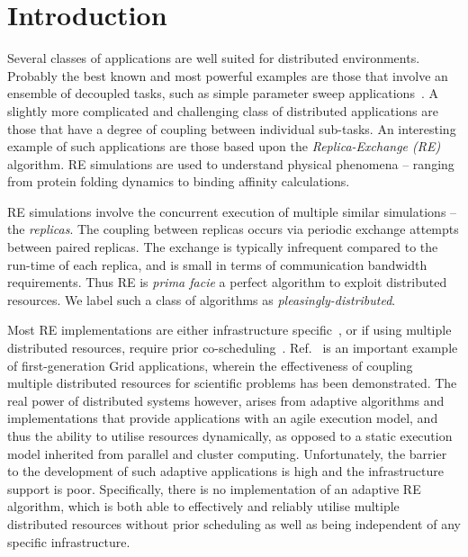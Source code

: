 \documentclass{rspublic}
\begin{document}
\section{Introduction}

Several classes of applications are well suited for distributed
environments. Probably the best known and most powerful examples are
those that involve an ensemble of decoupled tasks, such as simple
parameter sweep applications~\citep{1239909}.  A slightly more
complicated and challenging class of distributed applications are
those that have a degree of coupling between individual sub-tasks.  An
interesting example of such applications are those based upon the
\emph{Replica-Exchange (RE)}~\citep{hansmann,Sugita:1999rm} algorithm.
RE simulations are used to understand physical phenomena -- ranging
from protein folding dynamics to binding affinity calculations.

RE simulations involve the concurrent execution of multiple similar
simulations -- the \emph{replicas}. The coupling between replicas
occurs via periodic exchange attempts between paired replicas. The
exchange is typically infrequent compared to the run-time of each
replica, and is small in terms of communication bandwidth
requirements. Thus RE is {\it prima facie} a perfect algorithm to
exploit distributed resources. We label such a class of algorithms as
{\it pleasingly-distributed}.

Most RE implementations are either infrastructure
specific~\citep{Woods:2005nx}, or if using multiple distributed
resources, require prior co-scheduling~\citep{repex_mpig}.
Ref.~\citep{repex_mpig} is an important example of first-generation
Grid applications, wherein the effectiveness of coupling multiple
distributed resources for scientific problems has been demonstrated.
The real power of distributed systems however, arises from adaptive
algorithms and implementations that provide applications with an agile
execution model, and thus the ability to utilise resources
dynamically, as opposed to a static execution model inherited from
parallel and cluster computing.  Unfortunately, the barrier to the
development of such adaptive applications is high and the
infrastructure support is poor.
Specifically, there is no implementation of an
adaptive RE algorithm, which is both able to effectively and reliably
utilise multiple distributed resources without prior scheduling as
well as being independent of any specific %
infrastructure.
                      
\end{document}
